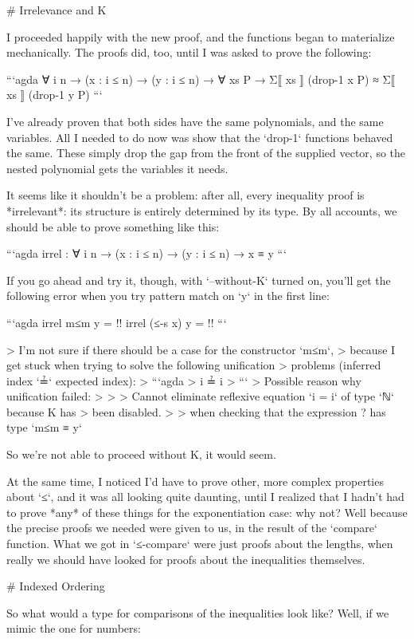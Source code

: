 \documentclass{article}
\begin{document}
# Irrelevance and K

I proceeded happily with the new proof, and the functions began to materialize
mechanically. The proofs did, too, until I was asked to prove the following:

```agda
∀ {i n}
→ (x : i ≤ n)
→ (y : i ≤ n)
→ ∀ xs Ρ
→ Σ⟦ xs ⟧ (drop-1 x Ρ) ≈ Σ⟦ xs ⟧ (drop-1 y Ρ)
```

I've already proven that both sides have the same polynomials, and the same
variables. All I needed to do now was show that the `drop-1` functions behaved
the same. These simply drop the gap from the front of the supplied vector, so
the nested polynomial gets the variables it needs.

It seems like it shouldn't be a problem: after all, every inequality proof is
*irrelevant*: its structure is entirely determined by its type. By all
accounts, we should be able to prove something like this:

```agda
irrel : ∀ {i  n}
      → (x : i ≤ n)
      → (y : i ≤ n)
      → x ≡ y
```

If you go ahead and try it, though, with `--without-K` turned on, you'll get the
following error when you try pattern match on `y` in the first line:

```agda
irrel m≤m y = {!!}
irrel (≤-s x) y = {!!}
```

> I'm not sure if there should be a case for the constructor `m≤m`,
> because I get stuck when trying to solve the following unification
> problems (inferred index `≟` expected index):
> ```agda
>   i ≟ i
> ```
> Possible reason why unification failed:
>
> > Cannot eliminate reflexive equation `i = i` of type `ℕ` because K has
>   been disabled.
>
> when checking that the expression ? has type `m≤m ≡ y`

So we're not able to proceed without K, it would seem.

At the same time, I noticed I'd have to prove other, more complex properties
about `≤`, and it was all looking quite daunting, until I realized that I hadn't
had to prove *any* of these things for the exponentiation case: why not? Well
because the precise proofs we needed were given to us, in the result of the
`compare` function. What we got in `≤-compare` were just proofs about the
lengths, when really we should have looked for proofs about the inequalities
themselves.

# Indexed Ordering

So what would a type for comparisons of the inequalities look like? Well, if we
mimic the one for numbers:
\end{document}
